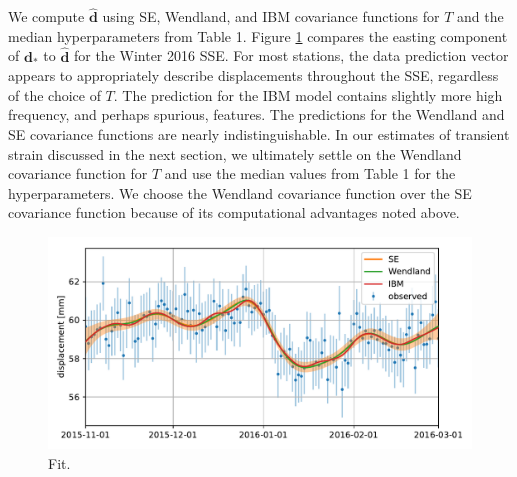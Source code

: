 \documentclass[10pt,a4paper]{article}
\begin{document}
We compute $\hat{\bm{d}}$ using SE, Wendland, and IBM covariance functions for $T$ and the median hyperparameters from Table 1. Figure \ref{fig:Fit} compares the easting component of $\bm{d}_*$ to $\hat{\bm{d}}$ for the Winter 2016 SSE.  For most stations, the data prediction vector appears to appropriately describe displacements throughout the SSE, regardless of the choice of $T$. The prediction for the IBM model contains slightly more high frequency, and perhaps spurious, features. The predictions for the Wendland and SE covariance functions are nearly indistinguishable. In our estimates of transient strain discussed in the next section, we ultimately settle on the Wendland covariance function for $T$ and use the median values from Table 1 for the hyperparameters. We choose the Wendland covariance function over the SE covariance function because of its computational advantages noted above.     

\begin{figure}
\includegraphics{figures/signal_fit/signal-fit.pdf}
\caption{Fit.}   
\label{fig:Fit}
\end{figure}
\end{document}
